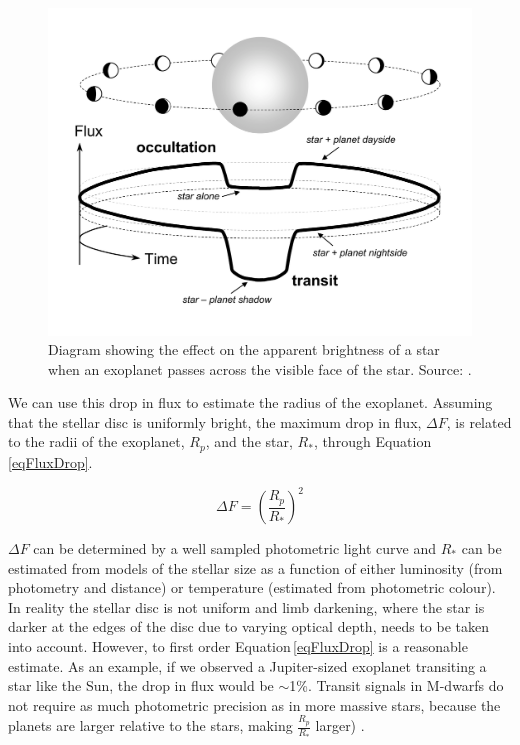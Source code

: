 \begin{figure}[hbt]
\centering
\includegraphics[scale=0.4]{circular_diagram.pdf}
\caption{Diagram showing the effect on the apparent brightness of a star when an exoplanet passes across the visible face of the star. Source: \citet{2010Winn}.}
\label{figTransit}
\end{figure}

We can use this drop in flux to estimate the radius of the exoplanet. Assuming that the stellar disc is uniformly bright, the maximum drop in flux, $\Delta F$, is related to the radii of the exoplanet, $R_p$, and the star, $R_\ast$, through Equation\,\ref{eqFluxDrop}. 

\begin{equation}
\Delta F = \left(\frac{R_p}{R_\ast}\right)^2
\label{eqFluxDrop}
\end{equation}

$\Delta F$ can be determined by a well sampled photometric light curve and $R_\ast$ can be estimated from models of the stellar size as a function of either luminosity (from photometry and distance) or temperature (estimated from photometric colour). In reality the stellar disc is not uniform and limb darkening, where the star is darker at the edges of the disc due to varying optical depth, needs to be taken into account. However, to first order Equation\,\ref{eqFluxDrop} is a reasonable estimate. As an example, if we observed a Jupiter-sized exoplanet transiting a star like the Sun, the drop in flux would be $\sim$1\%. Transit signals in M-dwarfs do not require as much photometric precision as in more massive stars, because the planets are larger relative to the stars, making $\frac{R_p}{R_\ast}$ larger) \citep{2011Lepine}.\\

